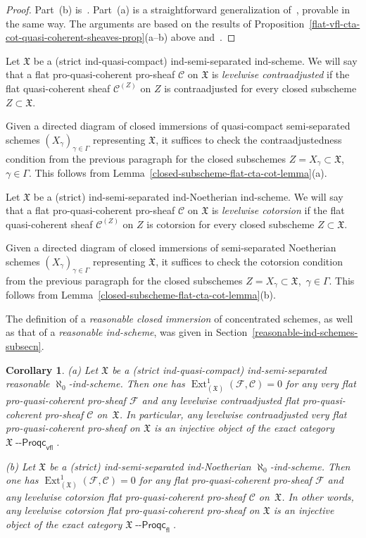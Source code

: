 \documentclass[12pt,a4paper]{amsart}
\newcommand{\+}{\protect\nobreakdash-}
\renewcommand{\:}{\colon}
\DeclareMathOperator{\Ext}{Ext}
\newcommand{\Proqc}{{\operatorname{\mathsf{--Proqc}}}}
\newcommand{\fl}{\mathsf{fl}}
\newcommand{\vfl}{\mathsf{vfl}}
\newcommand{\fX}{\mathfrak X}
\newcommand{\rC}{\mathscr C}
\newcommand{\rF}{\mathscr F}
\theoremstyle{plain}
\newtheorem{cor}[thm]{Corollary}
\theoremstyle{definition}
\begin{document}
\begin{proof}
 Part~(b) is~\cite[Corollary~8.5.3(b)]{Pform}.
 Part~(a) is a straightforward generalization
of~\cite[Corollary~8.5.3(a)]{Pform}, provable in the same way.
 The arguments are based on the results of
Proposition~\ref{flat-vfl-cta-cot-quasi-coherent-sheaves-prop}(a\+-b)
above and~\cite[Corollaries~1.7.4(a) and~1.7.5(a)]{Pcosh}.
\end{proof}

 Let $\fX$ be a (strict ind-quasi-compact) ind-semi-separated
ind-scheme.
 We will say that a flat pro-quasi-coherent pro-sheaf $\rC$ on $\fX$
is \emph{levelwise contraadjusted} if the flat quasi-coherent sheaf
$\rC^{(Z)}$ on $Z$ is contraadjusted for every closed subscheme
$Z\subset\fX$.

 Given a directed diagram of closed immersions of quasi-compact
semi-separated schemes $(X_\gamma)_{\gamma\in\Gamma}$ representing
$\fX$, it suffices to check the contraadjustedness condition from
the previous paragraph for the closed subschemes $Z=X_\gamma\subset
\fX$, \,$\gamma\in\Gamma$.
 This follows from Lemma~\ref{closed-subscheme-flat-cta-cot-lemma}(a).

 Let $\fX$ be a (strict) ind-semi-separated ind-Noetherian ind-scheme.
 We will say that a flat pro-quasi-coherent pro-sheaf $\rC$ on $\fX$
is \emph{levelwise cotorsion} if the flat quasi-coherent sheaf
$\rC^{(Z)}$ on $Z$ is cotorsion for every closed subscheme
$Z\subset\fX$.

 Given a directed diagram of closed immersions of semi-separated
Noetherian schemes $(X_\gamma)_{\gamma\in\Gamma}$ representing
$\fX$, it suffices to check the cotorsion condition from the previous
paragraph for the closed subschemes $Z=X_\gamma\subset\fX$,
\,$\gamma\in\Gamma$.
 This follows from Lemma~\ref{closed-subscheme-flat-cta-cot-lemma}(b).

 The definition of a \emph{reasonable closed immersion} of
concentrated schemes, as well as that of a \emph{reasonable ind-scheme},
was given in Section~\ref{reasonable-ind-schemes-subsecn}.

\begin{cor} \label{levelwise-cta-cot-orthogonality-cor}
\textup{(a)} Let\/ $\fX$ be a (strict ind-quasi-compact)
ind-semi-separated reasonable\/ $\aleph_0$\+ind-scheme.
 Then one has\/ $\Ext_{(\fX)}^1(\rF,\rC)=0$ for any very flat
pro-quasi-coherent pro-sheaf\/ $\rF$ and any levelwise 
contraadjusted flat pro-quasi-coherent pro-sheaf\/ $\rC$ on\/~$\fX$.
 In particular, any levelwise contraadjusted very flat
pro-quasi-coherent pro-sheaf on\/ $\fX$ is an injective object of
the exact category\/ $\fX\Proqc_\vfl$.
\par
\textup{(b)} Let\/ $\fX$ be a (strict) ind-semi-separated
ind-Noetherian\/ $\aleph_0$\+ind-scheme.
 Then one has\/ $\Ext_{(\fX)}^1(\rF,\rC)=0$ for any flat
pro-quasi-coherent pro-sheaf\/ $\rF$ and any levelwise cotorsion
flat pro-quasi-coherent pro-sheaf\/ $\rC$ on\/~$\fX$.
 In other words, any levelwise cotorsion flat pro-quasi-coherent
pro-sheaf on\/ $\fX$ is an injective object of the exact category\/
$\fX\Proqc_\fl$.
\end{cor}
\end{document}

